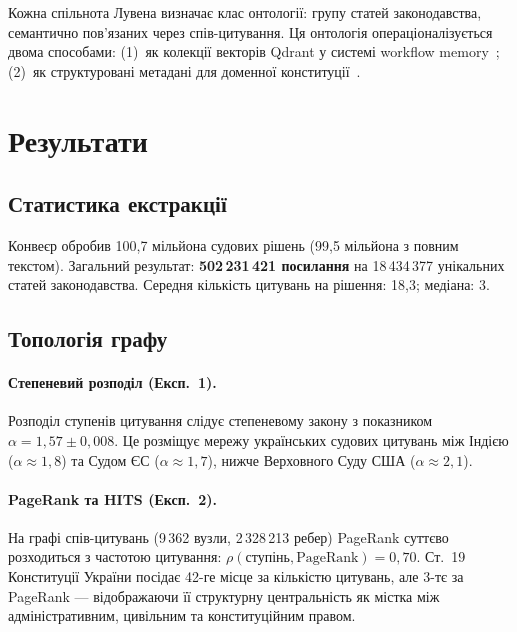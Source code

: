 \documentclass[11pt]{article}
\begin{document}
Кожна спільнота Лувена визначає клас онтології: групу статей законодавства, семантично пов'язаних через спів-цитування.
Ця онтологія операціоналізується двома способами:
(1)~як колекції векторів Qdrant у системі workflow memory~\citep{ovcharov2026workflowmemory};
(2)~як структуровані метадані для доменної конституції~\citep{ovcharov2026bridge}.


\section{Результати}
\label{sec:results}

\subsection{Статистика екстракції}

Конвеєр обробив 100,7 мільйона судових рішень (99,5 мільйона з повним текстом).
Загальний результат: \textbf{502\,231\,421 посилання} на 18\,434\,377 унікальних статей законодавства.
Середня кількість цитувань на рішення: 18,3; медіана: 3.

\subsection{Топологія графу}

\paragraph{Степеневий розподіл (Експ.~1).}
Розподіл ступенів цитування слідує степеневому закону з показником $\alpha = 1{,}57 \pm 0{,}008$.
Це розміщує мережу українських судових цитувань між Індією ($\alpha \approx 1{,}8$) та Судом ЄС ($\alpha \approx 1{,}7$), нижче Верховного Суду США ($\alpha \approx 2{,}1$).

\paragraph{PageRank та HITS (Експ.~2).}
На графі спів-цитувань (9\,362 вузли, 2\,328\,213 ребер) PageRank суттєво розходиться з частотою цитування: $\rho(\text{ступінь}, \text{PageRank}) = 0{,}70$.
Ст.~19 Конституції України посідає 42-ге місце за кількістю цитувань, але 3-тє за PageRank --- відображаючи її структурну центральність як містка між адміністративним, цивільним та конституційним правом.
\end{document}
